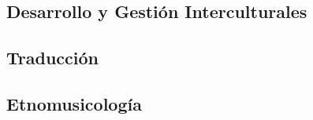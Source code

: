 \subsection{Desarrollo y Gestión Interculturales}

\subsection{Traducción}

\subsection{Etnomusicología}
\sincodigo

%
